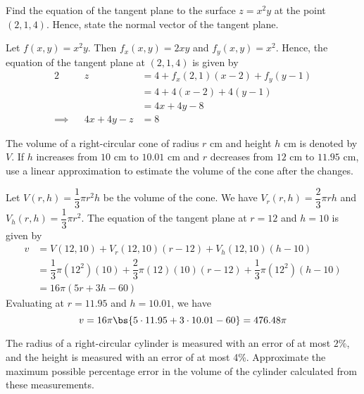 \documentclass{echw}
\begin{document}


    \problem{}
        Find the equation of the tangent plane to the surface $z = x^2 y$ at the point $(2, 1, 4)$. Hence, state the normal vector of the tangent plane.

    \solution
        Let $f(x, y) = x^2y$. Then $f_x(x, y) = 2xy$ and $f_y(x, y) = x^2$. Hence, the equation of the tangent plane at $(2, 1, 4)$ is given by 
        \begin{alignat*}{2}
            &&z &= 4 + f_x(2, 1)(x-2) + f_y(y - 1)\\
            && &= 4 + 4(x-2) + 4(y-1)\\
            && &= 4x + 4y - 8\\
            \implies&&4x + 4y - z &= 8
        \end{alignat*}


    \problem{}
        The volume of a right-circular cone of radius $r$ cm and height $h$ cm is denoted by $V$. If $h$ increases from $10$ cm to $10.01$ cm and $r$ decreases from $12$ cm to $11.95$ cm, use a linear approximation to estimate the volume of the cone after the changes.

    \solution
        Let $V(r, h) = \dfrac13 \pi r^2 h$ be the volume of the cone. We have $V_r(r, h) = \dfrac23 \pi r h$ and $V_h(r, h) = \dfrac13 \pi r^2$. The equation of the tangent plane at $r = 12$ and $h = 10$ is given by
        \begin{align*}
            v &= V(12, 10) + V_r(12, 10)(r-12) + V_h(12, 10)(h-10)\\
            &= \dfrac13\pi(12^2)(10) + \dfrac23 \pi(12)(10)(r - 12) + \dfrac13 \pi (12^2) (h-10)\\
            &= 16\pi(5r + 3h - 60)
        \end{align*}
        Evaluating at $r = 11.95$ and $h = 10.01$, we have
        \[v = 16\pi\bs{5\cdot11.95 + 3\cdot10.01 - 60} = 476.48\pi\]

    \problem{}
        The radius of a right-circular cylinder is measured with an error of at most $2\%$, and the height is measured with an error of at most 4\%. Approximate the maximum possible percentage error in the volume of the cylinder calculated from these measurements.
\end{document}
